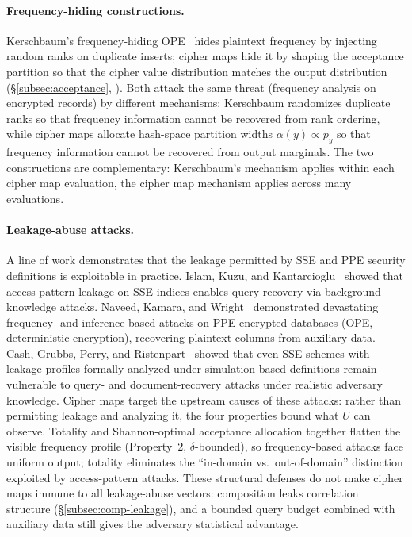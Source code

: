 \documentclass[11pt]{article}
\theoremstyle{definition}
\theoremstyle{plain}
\theoremstyle{remark}
\begin{document}
\paragraph{Frequency-hiding constructions.}
Kerschbaum's frequency-hiding OPE~\cite{kerschbaum2015frequency} hides
plaintext frequency by injecting random ranks on duplicate inserts;
cipher maps hide it by shaping the acceptance partition so that the
cipher value distribution matches the output distribution
(\S\ref{subsec:acceptance}, ).  Both
attack the same threat (frequency analysis on encrypted records) by
different mechanisms: Kerschbaum randomizes duplicate ranks so that
frequency information cannot be recovered from rank ordering, while
cipher maps allocate hash-space partition widths $\alpha(y) \propto p_y$
so that frequency information cannot be recovered from output marginals.
The two constructions are complementary: Kerschbaum's mechanism applies
within each cipher map evaluation, the cipher map mechanism applies
across many evaluations.

\paragraph{Leakage-abuse attacks.}
A line of work demonstrates that the leakage permitted by SSE and PPE
security definitions is exploitable in practice.  Islam, Kuzu, and
Kantarcioglu~\cite{islam2012access} showed that access-pattern leakage on
SSE indices enables query recovery via background-knowledge attacks.
Naveed, Kamara, and Wright~\cite{naveed2015inference} demonstrated
devastating frequency- and inference-based attacks on PPE-encrypted
databases (OPE, deterministic encryption), recovering plaintext columns from
auxiliary data.  Cash, Grubbs, Perry, and
Ristenpart~\cite{cash2015leakage} showed that even SSE schemes with
leakage profiles formally analyzed under simulation-based definitions
remain vulnerable to query- and document-recovery attacks under realistic
adversary knowledge.
Cipher maps target the upstream causes of these attacks: rather than
permitting leakage and analyzing it, the four properties bound what
$U$ can observe.  Totality and Shannon-optimal acceptance allocation
together flatten the visible frequency profile (Property~2,
$\delta$-bounded), so frequency-based attacks face uniform output;
totality eliminates the ``in-domain vs.\ out-of-domain'' distinction
exploited by access-pattern attacks.  These structural defenses do not
make cipher maps immune to all leakage-abuse vectors: composition leaks
correlation structure (\S\ref{subsec:comp-leakage}), and a bounded query
budget combined with auxiliary data still gives the adversary statistical
advantage.
\end{document}
